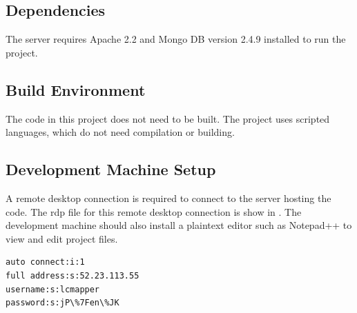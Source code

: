 \subsection{Dependencies}
The server requires Apache 2.2 and Mongo DB version 2.4.9 installed to run the project.

\subsection{Build  Environment}
The code in this project does not need to be built. The project uses scripted languages, which do not need compilation or building. 

\subsection{Development Machine Setup}
A remote desktop connection is required to connect to the server hosting the code. The rdp file for this remote desktop connection is show in . The development machine should also install a plaintext editor such as Notepad++ to view and edit project files.
\begin{lstlisting}[caption=Remote Desktop Connection (.rdp) file, label=alg_rdp]
auto connect:i:1
full address:s:52.23.113.55
username:s:lcmapper
password:s:jP\%7Fen\%JK
\end{lstlisting}


